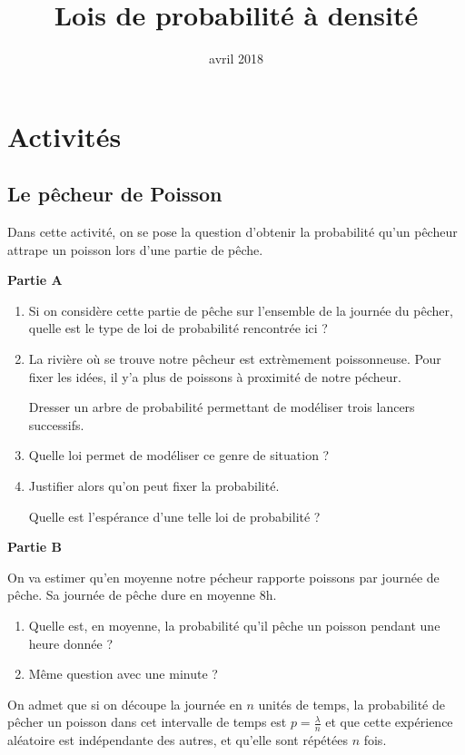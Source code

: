 \documentclass[11pt,a4paper,french]{article}
\title{Lois de probabilité à densité}
\author{\bsc{Jumel}}
\date{avril 2018}
\makeatletter
\renewcommand{\maketitle}%
{\framebox{%
    \begin{minipage}{1.0\linewidth}%
      \begin{center}%
        \Large \@title ~-- \@author \\%
        \@date%
      \end{center}%
    \end{minipage}}%
  \normalsize%
}
\theoremstyle{break}
\theoremstyle{plain}
\theoremstyle{nonumberplain}
\theoremstyle{nonumberbreak}
\makeatother
\begin{document}
\noindent\maketitle

\bigskip

\section*{Activités}

\subsection*{Le pêcheur de Poisson}

Dans cette activité, on se pose la question d'obtenir la probabilité
qu'un pêcheur attrape un poisson lors d'une partie de pêche.

\textbf{Partie A}

\begin{enumerate}
  \item Si on considère cette partie de pêche sur l'ensemble de la
    journée du pêcher, quelle est le type de loi de probabilité
    rencontrée ici ?
  \item La rivière où se trouve notre pêcheur est extrèmement
    poissonneuse. Pour fixer les idées, il y'a plus de 
    poissons à proximité de notre pécheur.

    Dresser un arbre de probabilité permettant de modéliser trois
    lancers successifs.
  \item Quelle loi permet de modéliser ce genre de situation ?
  \item Justifier alors qu'on peut fixer la probabilité.

    Quelle est l'espérance d'une telle loi de probabilité ?
\end{enumerate}

\textbf{Partie B}

On va estimer qu'en moyenne notre pécheur rapporte  poissons par
journée de pêche. Sa journée de pêche dure en moyenne 8h.

\begin{enumerate}
  \item Quelle est, en moyenne, la probabilité qu'il pêche un poisson
    pendant une heure donnée ?
  \item Même question avec une minute ?
\end{enumerate}

On admet que si on découpe la journée en $n$ unités de temps, la
probabilité de pêcher un poisson dans cet intervalle de temps est
$p = \frac{\lambda}{n}$ et que cette expérience aléatoire est
indépendante des autres, et qu'elle sont répétées $n$ fois.
\end{document}
